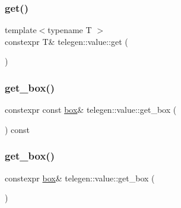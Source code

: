 \mbox{\label{classtelegen_1_1value_af3cd1843daaccaadcdf2a526147c485e}} 
\subsubsection{\texorpdfstring{get()}{get()}\hspace{0.1cm}{\footnotesize\ttfamily [2/2]}}
{\footnotesize\ttfamily template$<$typename T $>$ \\
constexpr T\& telegen\+::value\+::get (\begin{DoxyParamCaption}{ }\end{DoxyParamCaption})\hspace{0.3cm}{\ttfamily [inline]}}

\mbox{\label{classtelegen_1_1value_a28195c2d95fc3d7c61bcc32cb4f64d66}} 
\subsubsection{\texorpdfstring{get\+\_\+box()}{get\_box()}\hspace{0.1cm}{\footnotesize\ttfamily [1/2]}}
{\footnotesize\ttfamily constexpr const \hyperlink{uniontelegen_1_1value_1_1box}{box}\& telegen\+::value\+::get\+\_\+box (\begin{DoxyParamCaption}{ }\end{DoxyParamCaption}) const\hspace{0.3cm}{\ttfamily [inline]}}

\mbox{\label{classtelegen_1_1value_a81c1fb26319a11335d1745fc2d01e36b}} 
\subsubsection{\texorpdfstring{get\+\_\+box()}{get\_box()}\hspace{0.1cm}{\footnotesize\ttfamily [2/2]}}
{\footnotesize\ttfamily constexpr \hyperlink{uniontelegen_1_1value_1_1box}{box}\& telegen\+::value\+::get\+\_\+box (\begin{DoxyParamCaption}{ }\end{DoxyParamCaption})\hspace{0.3cm}{\ttfamily [inline]}}

